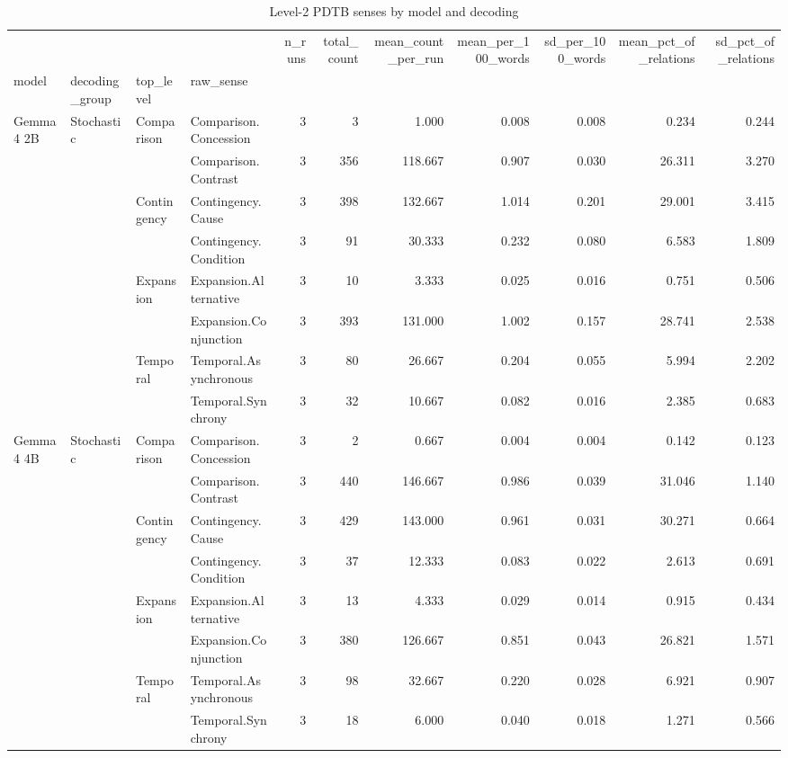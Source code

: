 \begin{table}
\caption{Level-2 PDTB senses by model and decoding}
\begin{tabular}{llllrrrrrrr}
\toprule
 &  &  &  & n\_runs & total\_count & mean\_count\_per\_run & mean\_per\_100\_words & sd\_per\_100\_words & mean\_pct\_of\_relations & sd\_pct\_of\_relations \\
model & decoding_group & top_level & raw_sense &  &  &  &  &  &  &  \\
\midrule
\multirow[t]{8}{*}{Gemma 4 2B} & \multirow[t]{8}{*}{Stochastic} & \multirow[t]{2}{*}{Comparison} & Comparison.Concession & 3 & 3 & 1.000 & 0.008 & 0.008 & 0.234 & 0.244 \\
 &  &  & Comparison.Contrast & 3 & 356 & 118.667 & 0.907 & 0.030 & 26.311 & 3.270 \\
\cline{3-11}
 &  & \multirow[t]{2}{*}{Contingency} & Contingency.Cause & 3 & 398 & 132.667 & 1.014 & 0.201 & 29.001 & 3.415 \\
 &  &  & Contingency.Condition & 3 & 91 & 30.333 & 0.232 & 0.080 & 6.583 & 1.809 \\
\cline{3-11}
 &  & \multirow[t]{2}{*}{Expansion} & Expansion.Alternative & 3 & 10 & 3.333 & 0.025 & 0.016 & 0.751 & 0.506 \\
 &  &  & Expansion.Conjunction & 3 & 393 & 131.000 & 1.002 & 0.157 & 28.741 & 2.538 \\
\cline{3-11}
 &  & \multirow[t]{2}{*}{Temporal} & Temporal.Asynchronous & 3 & 80 & 26.667 & 0.204 & 0.055 & 5.994 & 2.202 \\
 &  &  & Temporal.Synchrony & 3 & 32 & 10.667 & 0.082 & 0.016 & 2.385 & 0.683 \\
\cline{1-11} \cline{2-11} \cline{3-11}
\multirow[t]{8}{*}{Gemma 4 4B} & \multirow[t]{8}{*}{Stochastic} & \multirow[t]{2}{*}{Comparison} & Comparison.Concession & 3 & 2 & 0.667 & 0.004 & 0.004 & 0.142 & 0.123 \\
 &  &  & Comparison.Contrast & 3 & 440 & 146.667 & 0.986 & 0.039 & 31.046 & 1.140 \\
\cline{3-11}
 &  & \multirow[t]{2}{*}{Contingency} & Contingency.Cause & 3 & 429 & 143.000 & 0.961 & 0.031 & 30.271 & 0.664 \\
 &  &  & Contingency.Condition & 3 & 37 & 12.333 & 0.083 & 0.022 & 2.613 & 0.691 \\
\cline{3-11}
 &  & \multirow[t]{2}{*}{Expansion} & Expansion.Alternative & 3 & 13 & 4.333 & 0.029 & 0.014 & 0.915 & 0.434 \\
 &  &  & Expansion.Conjunction & 3 & 380 & 126.667 & 0.851 & 0.043 & 26.821 & 1.571 \\
\cline{3-11}
 &  & \multirow[t]{2}{*}{Temporal} & Temporal.Asynchronous & 3 & 98 & 32.667 & 0.220 & 0.028 & 6.921 & 0.907 \\
 &  &  & Temporal.Synchrony & 3 & 18 & 6.000 & 0.040 & 0.018 & 1.271 & 0.566 \\
\cline{1-11} \cline{2-11} \cline{3-11}
\bottomrule
\end{tabular}
\end{table}
